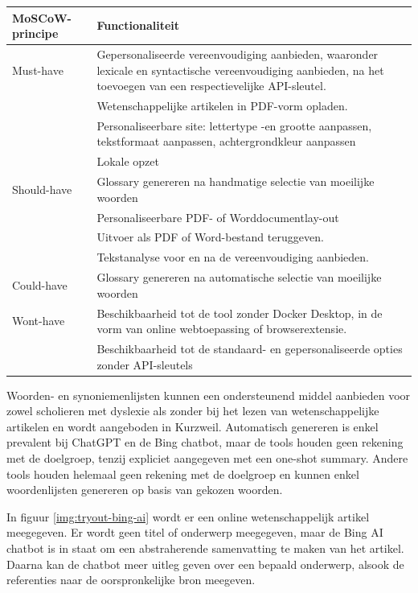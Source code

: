 \begin{center}
	\begin{tabular}{ | m{4cm} | m{12cm} | } 
		\hline
		\textbf{MoSCoW-principe} & Functionaliteit \\
		\hline
		Must-have & Gepersonaliseerde vereenvoudiging aanbieden, waaronder lexicale en syntactische vereenvoudiging aanbieden, na het toevoegen van een respectievelijke API-sleutel. \\
		& Wetenschappelijke artikelen in PDF-vorm opladen. \\
		& Personaliseerbare site: lettertype -en grootte aanpassen, tekstformaat aanpassen, achtergrondkleur aanpassen \\
		& Lokale opzet \\
		\hline
		Should-have & Glossary genereren na handmatige selectie van moeilijke woorden \\
		& Personaliseerbare PDF- of Worddocumentlay-out \\
		& Uitvoer als PDF of Word-bestand teruggeven. \\
		& Tekstanalyse voor en na de vereenvoudiging aanbieden. \\
		\hline
		Could-have & Glossary genereren na automatische selectie van moeilijke woorden \\
		\hline
		Wont-have & Beschikbaarheid tot de tool zonder Docker Desktop, in de vorm van online webtoepassing of browserextensie. \\
		& Beschikbaarheid tot de standaard- en gepersonaliseerde opties zonder API-sleutels \\
		\hline
	\end{tabular}
\end{center}

\medspace

Woorden- en synoniemenlijsten kunnen een ondersteunend middel aanbieden voor zowel scholieren met dyslexie als zonder bij het lezen van wetenschappelijke artikelen en wordt aangeboden in Kurzweil. Automatisch genereren is enkel prevalent bij ChatGPT en de Bing chatbot, maar de tools houden geen rekening met de doelgroep, tenzij expliciet aangegeven met een one-shot summary. Andere tools houden helemaal geen rekening met de doelgroep en kunnen enkel woordenlijsten genereren op basis van gekozen woorden.

\medspace

In figuur \ref{img:tryout-bing-ai} wordt er een online wetenschappelijk artikel meegegeven. Er wordt geen titel of onderwerp meegegeven, maar de Bing AI chatbot is in staat om een abstraherende samenvatting te maken van het artikel. Daarna kan de chatbot meer uitleg geven over een bepaald onderwerp, alsook de referenties naar de oorspronkelijke bron meegeven. 


